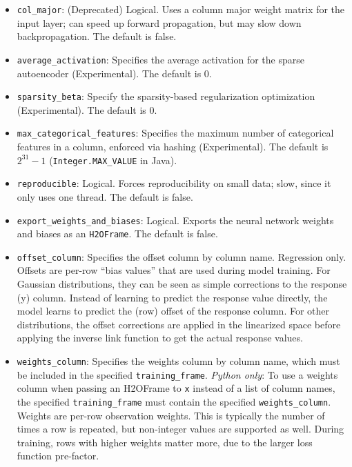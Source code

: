 {{{\begin{itemize}
\item \texttt{col\_major}: (Deprecated) Logical. Uses a column major weight matrix for the input layer; can speed up forward propagation, but may slow down backpropagation. The default is false.

\item \texttt{average\_activation}: Specifies the average activation for the sparse autoencoder (Experimental).
The default is 0.

\item \texttt{sparsity\_beta}: Specify the sparsity-based regularization optimization (Experimental).  The default is 0. 

\item \texttt{max\_categorical\_features}:  Specifies the maximum number of categorical features in a column, enforced via hashing (Experimental).  The default is $2^{31}-1$ (\texttt{Integer.MAX\_VALUE} in Java).

\item \texttt{reproducible}: Logical. Forces reproducibility on small data; slow, since it only uses one thread.  The default is false.

\item \texttt{export\_weights\_and\_biases}: Logical. Exports the neural network weights and biases as an \texttt{H2OFrame}.  The default is false.

%

\item \texttt{offset\_column}:  Specifies the offset column by column name.  Regression only.  Offsets are per-row ``bias values'' that are used during model training. For Gaussian distributions, they can be seen as simple corrections to the response (y) column. Instead of learning to predict the response value directly, the model learns to predict the (row) offset of the response column. For other distributions, the offset corrections are applied in the linearized space before applying the inverse link function to get the actual response values. 

\item \texttt{weights\_column}: Specifies the weights column by column name, which must be included in the specified \texttt{training\_frame}. \textit{Python only}: To use a weights column when passing an H2OFrame to \texttt{x} instead of a list of column names, the specified \texttt{training\_frame} must contain the specified \texttt{weights\_column}. Weights are per-row observation weights. This is typically the number of times a row is repeated, but non-integer values are supported as well. During training, rows with higher weights matter more, due to the larger loss function pre-factor.


\end{itemize}}}}
